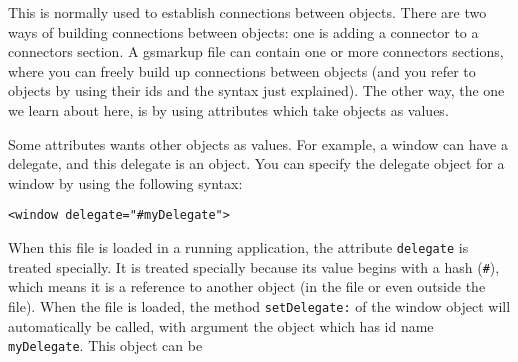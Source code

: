 This is normally used to establish connections between objects.  There
are two ways of building connections between objects: one is adding a
connector to a connectors section.  A gsmarkup file can contain one or
more connectors sections, where you can freely build up connections
between objects (and you refer to objects by using their ids and the
syntax just explained).  The other way, the one we learn about here,
is by using attributes which take objects as values.

Some attributes wants other objects as values.  For example, a window
can have a delegate, and this delegate is an object.  You can specify
the delegate object for a window by using the following syntax:
\begin{verbatim}
<window delegate="#myDelegate">
\end{verbatim}
When this file is loaded in a running application, the attribute 
\texttt{delegate} is treated specially.  It is treated specially because
its value begins with a hash (\texttt{\#}), which means it is a
reference to another object (in the file or even outside the file).
When the file is loaded, the method \texttt{setDelegate:} of the
window object will automatically be called, with argument the object
which has id name \texttt{myDelegate}.  This object can be 
